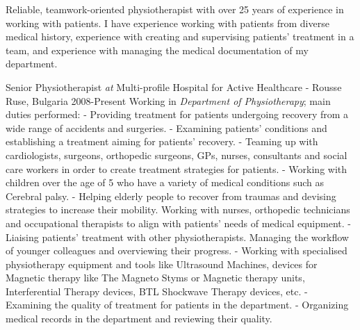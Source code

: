 \documentclass[11pt, a4paper]{awesome-cv}
\newcommand*{\sectiondir}{resume/}
\begin{document}
\makecvheader
\let\cleardoublepage\clearpage
\vspace{+3mm}
\vspace{+3mm}
\vspace{+3mm}
\vspace{-10mm}
\cventryone
{}
{
Reliable, teamwork-oriented physiotherapist with over 25 years of experience in working with patients. I have experience working with patients from diverse medical history, experience with creating and supervising patients' treatment in a team, and experience with managing the medical documentation of my department. 
}
\vspace{+4mm}


\cventry
{Senior Physiotherapist \textit{at}  Multi-profile Hospital for Active Healthcare - Rousse}
{Ruse, Bulgaria 2008-Present}
{
Working in \textit{Department of Physiotherapy}; main duties performed: 
\newline
\hspace{3ex} - Providing treatment for patients undergoing recovery from a wide range of accidents and surgeries.
\newline
\hspace{3ex} - Examining patients' conditions and establishing a treatment aiming for patients' recovery. 
\newline
\hspace{3ex} - Teaming up with cardiologists, surgeons, orthopedic surgeons, GPs, nurses, consultants and social care workers in order to create treatment strategies for patients. 
\newline
\hspace{3ex} - Working with children over the age of 5 who have a variety of medical conditions such as Cerebral palsy.
\newline
\hspace{3ex} - Helping elderly people to recover from traumas and devising strategies to increase their mobility. Working with nurses, orthopedic technicians and occupational therapists to align with patients' needs of medical equipment. 
\newline
\hspace{3ex} - Liaising patients' treatment with other physiotherapists. Managing the workflow of younger colleagues and overviewing their progress. 
\newline
\hspace{3ex} - Working with specialised physiotherapy equipment and tools like Ultrasound Machines, devices for Magnetic therapy like The Magneto Styms or Magnetic therapy units, Interferential Therapy devices, BTL Shockwave Therapy devices, etc.
\newline
\hspace{3ex} - Examining the quality of treatment for patients in the department.
\newline
\hspace{3ex} - Organizing medical records in the department and reviewing their quality.   
}
\end{document}

